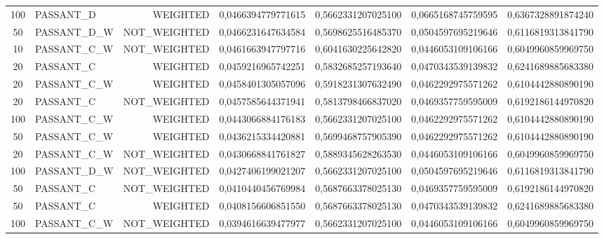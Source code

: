 \begin{table}[H]
{\begin{tabular}{ c l r c c c c }
					100 &  PASSANT\_D &   WEIGHTED & 0,0466394779771615 & 0,5662331207025100 & 0,0665168745759595 & 0,6367328891874240 \\
					
					50 & PASSANT\_D\_W & NOT\_WEIGHTED & 0,0466231647634584 & 0,5698625516485370 & 0,0504597695219646 & 0,6116819313841790 \\
					
					10 & PASSANT\_C\_W & NOT\_WEIGHTED & 0,0461663947797716 & 0,6041630225642820 & 0,0446053109106166 & 0,6049960859969750 \\
					
					20 &  PASSANT\_C &   WEIGHTED & 0,0459216965742251 & 0,5832685257193640 & 0,0470343539139832 & 0,6241689885683380 \\
					
					20 & PASSANT\_C\_W &   WEIGHTED & 0,0458401305057096 & 0,5918231307632490 & 0,0462292975571262 & 0,6104442880890190 \\
					
					20 &  PASSANT\_C & NOT\_WEIGHTED & 0,0457585644371941 & 0,5813798466837020 & 0,0469357759595009 & 0,6192186144970820 \\
					
					100 & PASSANT\_C\_W &   WEIGHTED & 0,0443066884176183 & 0,5662331207025100 & 0,0462292975571262 & 0,6104442880890190 \\
					
					50 & PASSANT\_C\_W &   WEIGHTED & 0,0436215334420881 & 0,5699468757905390 & 0,0462292975571262 & 0,6104442880890190 \\
					
					20 & PASSANT\_C\_W & NOT\_WEIGHTED & 0,0430668841761827 & 0,5889345628263530 & 0,0446053109106166 & 0,6049960859969750 \\
					
					100 & PASSANT\_D\_W & NOT\_WEIGHTED & 0,0427406199021207 & 0,5662331207025100 & 0,0504597695219646 & 0,6116819313841790 \\
					
					50 &  PASSANT\_C & NOT\_WEIGHTED & 0,0410440456769984 & 0,5687663378025130 & 0,0469357759595009 & 0,6192186144970820 \\
					
					50 &  PASSANT\_C &   WEIGHTED & 0,0408156606851550 & 0,5687663378025130 & 0,0470343539139832 & 0,6241689885683380 \\
					
					100 & PASSANT\_C\_W & NOT\_WEIGHTED & 0,0394616639477977 & 0,5662331207025100 & 0,0446053109106166 & 0,6049960859969750 \\
					

\end{tabular}}
\end{table}
